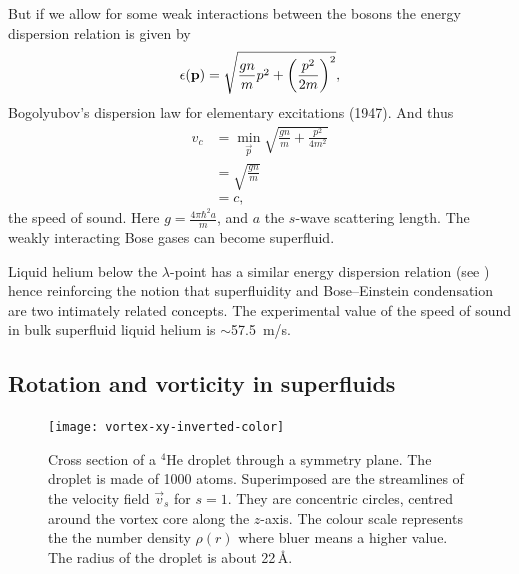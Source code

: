			But if we allow for some weak interactions between the bosons the energy dispersion relation is given by
			\begin{align}
				\epsilon(\bm{\mathrm{p}})=\sqrt{\frac{gn}{m}p^2+\qty(\frac{p^2}{2m})^2},
			\end{align}
			Bogolyubov's dispersion law for elementary excitations (1947). And thus
			\begin{align}
				v_c &=\min_{\vec{p}}\sqrt{\frac{gn}{m}+\frac{p^2}{4m^2}} \nonumber \\
					&= \sqrt{\frac{gn}{m}} \nonumber \\
					&= c,
			\end{align}
			the speed of sound. Here $g=\frac{4\pi\hbar^2a}{m}$, and $a$ the $s$-wave scattering length. The weakly interacting Bose gases can become superfluid.			

			Liquid helium below the $\lambda$-point has a similar energy dispersion relation (see ) hence reinforcing the notion that superfluidity and Bose--Einstein condensation are two intimately related concepts. The experimental value of the speed of sound in bulk superfluid liquid helium is $\sim$57.5~m/s.
			
		\subsection{Rotation and vorticity in superfluids}\label{sec:rot-vort}
			\begin{figure}[t]
				\begin{center}
					\texttt{[image: vortex-xy-inverted-color]}
					\caption{Cross section of a $^4$He droplet through a symmetry plane. The droplet is made of 1000 atoms. Superimposed are the streamlines of the velocity field $\vec{v}_s$ for $s=1$. They are concentric circles, centred around the vortex core along the $z$-axis. The colour scale represents the the number density $\rho(r)$ where bluer means a higher value. The radius of the droplet is about 22\,\AA.}
					\label{fig:vortex-xy}
				\end{center}
			\end{figure}
		
